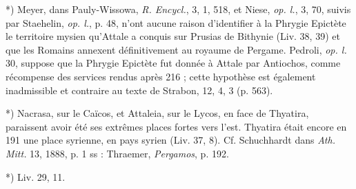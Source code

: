 \documentclass[a4paper, 11pt, oneside, polutonikogreek, french]{article}
\begin{document}
*) Meyer, dans Pauly-Wissowa, \emph{R. Encycl.}, 3, 1, 518, et Niese, \emph{op. l.}, 3, 70, suivis par Staehelin, \emph{op. l.}, p. 48, n'ont aucune raison d'identifier à la Phrygie Epictète le territoire mysien qu'Attale a conquis sur Prusias de Bithynie (Liv. 38, 39) et que les Romains annexent définitivement au royaume de Pergame. Pedroli, \emph{op. l.} 30, suppose que la Phrygie Epictète fut donnée à Attale par Antiochos, comme récompense des services rendus après 216 ; cette hypothèse est également inadmissible et contraire au texte de Strabon, 12, 4, 3 (p. 563).

*) Nacrasa, sur le Caïcos, et Attaleia, sur le Lycos, en face de Thyatira, paraissent avoir été ses extrêmes places fortes vers l'est. Thyatira était encore en 191 une place syrienne, en pays syrien (Liv. 37, 8). Cf. Schuchhardt dans \emph{Ath. Mitt.} 13, 1888, p. 1 ss : Thraemer, \emph{Pergamos}, p. 192.

*) Liv.  29, 11.
\end{document}
